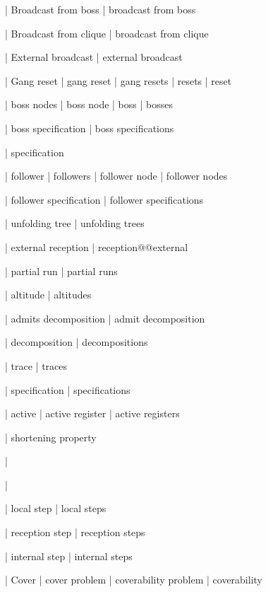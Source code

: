 | Broadcast from boss
| broadcast from boss

| Broadcast from clique
| broadcast from clique

| External broadcast
| external broadcast

| Gang reset
| gang reset
| gang resets
| resets
| reset


| boss nodes
| boss node
| boss
| bosses

| boss specification
| boss specifications

| specification

| follower
| followers
| follower node
| follower nodes

| follower specification
| follower specifications

| unfolding tree
| unfolding trees

| external reception
| reception@@external

| partial run
| partial runs

| altitude
| altitudes

| admits decomposition
| admit decomposition

| decomposition
| decompositions

| trace
| traces

| specification
| specifications


| active
| active register
| active registers

| shortening property

| \memoryproj

| \memoryproj

| local step
| local steps

| reception step
| reception steps

| internal step
| internal steps


| Cover
| cover problem
| coverability problem
| coverability

